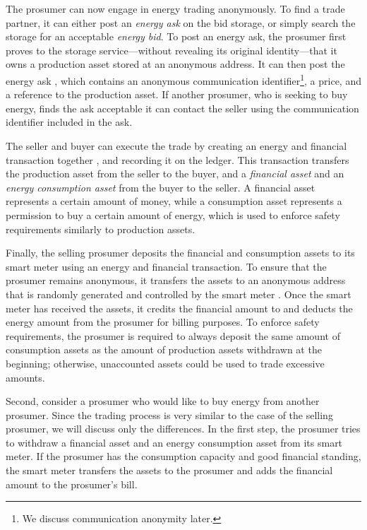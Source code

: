 The prosumer can now engage in energy trading anonymously.  To find a
trade partner, it can either post an \emph{energy ask} on the bid
storage, or simply search the storage for an acceptable \emph{energy
  bid}.  To post an energy ask, the prosumer first proves to the
storage service---without revealing its original identity---that it
owns a production asset stored at an anonymous address.  It can then
post the energy ask , which contains an anonymous
communication identifier\footnote{We discuss communication anonymity later.}, a price, and a reference
to the production asset.  If another prosumer, who is seeking to buy energy,
finds the ask acceptable it can contact the seller using the
communication identifier included in the ask.

The seller and buyer can execute the trade by creating an energy and
financial transaction together , and recording it on the
ledger.  This transaction transfers the production asset from the
seller to the buyer, and a \emph{financial asset} and an \emph{energy
  consumption asset} from the buyer to the seller.  A financial asset
represents a certain amount of money, while a consumption asset
represents a permission to buy a certain amount of energy, which is
used to enforce safety requirements similarly to production assets.

Finally, the selling prosumer deposits the financial and consumption
assets to its smart meter using an energy and financial transaction.
To ensure that the prosumer remains anonymous, it transfers the assets
to an anonymous address that is randomly generated and controlled by
the smart meter .  Once the smart meter has received the
assets, it credits the financial amount to and deducts the energy
amount from the prosumer for billing purposes.  To enforce safety
requirements, the prosumer is required to always deposit the same amount of
consumption assets as the amount of production assets withdrawn at the
beginning; otherwise, unaccounted assets could be used to trade
excessive amounts.

Second, consider a prosumer who would like to buy energy from another prosumer.
Since the trading process is very similar to the case of the selling prosumer, we will discuss only the differences.
In the first step, the prosumer tries to withdraw a financial asset and an energy consumption asset from its smart meter.
If the prosumer has the consumption capacity and good financial standing, the smart meter transfers the assets to the prosumer and adds the financial amount to the prosumer's bill.

